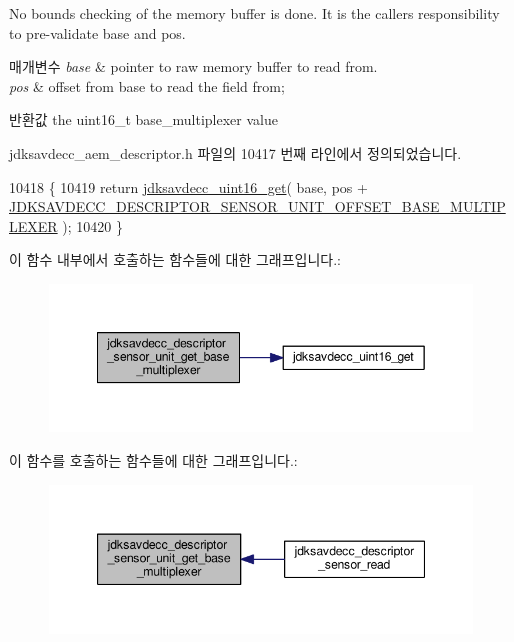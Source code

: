 No bounds checking of the memory buffer is done. It is the caller\textquotesingle{}s responsibility to pre-\/validate base and pos.


\begin{DoxyParams}{매개변수}
{\em base} & pointer to raw memory buffer to read from. \\
\hline
{\em pos} & offset from base to read the field from; \\
\hline
\end{DoxyParams}
\begin{DoxyReturn}{반환값}
the uint16\+\_\+t base\+\_\+multiplexer value 
\end{DoxyReturn}


jdksavdecc\+\_\+aem\+\_\+descriptor.\+h 파일의 10417 번째 라인에서 정의되었습니다.


\begin{DoxyCode}
10418 \{
10419     \textcolor{keywordflow}{return} \hyperlink{group__endian_ga3fbbbc20be954aa61e039872965b0dc9}{jdksavdecc\_uint16\_get}( base, pos + 
      \hyperlink{group__descriptor__sensor_ga306145716f08f4a05ca0dc9400fe4817}{JDKSAVDECC\_DESCRIPTOR\_SENSOR\_UNIT\_OFFSET\_BASE\_MULTIPLEXER}
       );
10420 \}
\end{DoxyCode}


이 함수 내부에서 호출하는 함수들에 대한 그래프입니다.\+:
\nopagebreak
\begin{figure}[H]
\begin{center}
\leavevmode
\includegraphics[width=349pt]{group__descriptor__sensor_ga5425485c446ab6df5c5dd42afc58d4e2_cgraph}
\end{center}
\end{figure}




이 함수를 호출하는 함수들에 대한 그래프입니다.\+:
\nopagebreak
\begin{figure}[H]
\begin{center}
\leavevmode
\includegraphics[width=347pt]{group__descriptor__sensor_ga5425485c446ab6df5c5dd42afc58d4e2_icgraph}
\end{center}
\end{figure}


